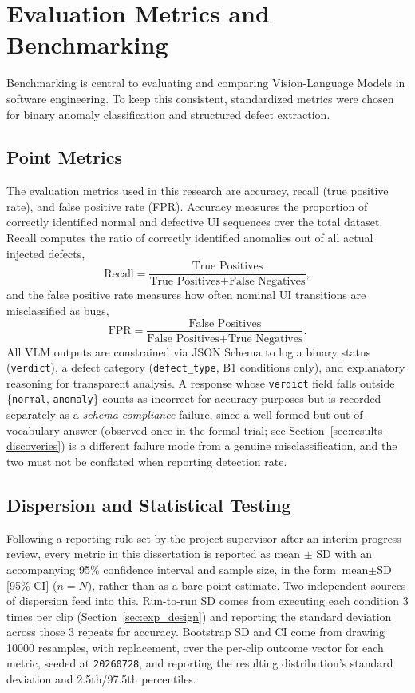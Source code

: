 \section{Evaluation Metrics and Benchmarking}
\label{sec:benchmarking}
Benchmarking is central to evaluating and comparing Vision-Language Models in software engineering. To keep this consistent, standardized metrics were chosen for binary anomaly classification and structured defect extraction.

\subsection{Point Metrics}
The evaluation metrics used in this research are accuracy, recall (true positive rate), and false positive rate (FPR). Accuracy measures the proportion of correctly identified normal and defective UI sequences over the total dataset. Recall computes the ratio of correctly identified anomalies out of all actual injected defects,
\begin{equation}
    \text{Recall} = \frac{\text{True Positives}}{\text{True Positives} + \text{False Negatives}},
\end{equation}
and the false positive rate measures how often nominal UI transitions are misclassified as bugs,
\begin{equation}
    \text{FPR} = \frac{\text{False Positives}}{\text{False Positives} + \text{True Negatives}}.
\end{equation}
All VLM outputs are constrained via JSON Schema to log a binary status (\texttt{verdict}), a defect category (\texttt{defect\_type}, B1 conditions only), and explanatory reasoning for transparent analysis. A response whose \texttt{verdict} field falls outside \{\texttt{normal}, \texttt{anomaly}\} counts as incorrect for accuracy purposes but is recorded separately as a \emph{schema-compliance} failure, since a well-formed but out-of-vocabulary answer (observed once in the formal trial; see Section~\ref{sec:results-discoveries}) is a different failure mode from a genuine misclassification, and the two must not be conflated when reporting detection rate.

\subsection{Dispersion and Statistical Testing}
Following a reporting rule set by the project supervisor after an interim progress review, every metric in this dissertation is reported as mean $\pm$ SD with an accompanying 95\% confidence interval and sample size, in the form $\text{mean} \pm \text{SD}$ [95\% CI] ($n=N$), rather than as a bare point estimate. Two independent sources of dispersion feed into this. Run-to-run SD comes from executing each condition 3 times per clip (Section~\ref{sec:exp_design}) and reporting the standard deviation across those 3 repeats for accuracy. Bootstrap SD and CI come from drawing \num{10000} resamples, with replacement, over the per-clip outcome vector for each metric, seeded at \texttt{20260728}, and reporting the resulting distribution's standard deviation and 2.5th/97.5th percentiles.

